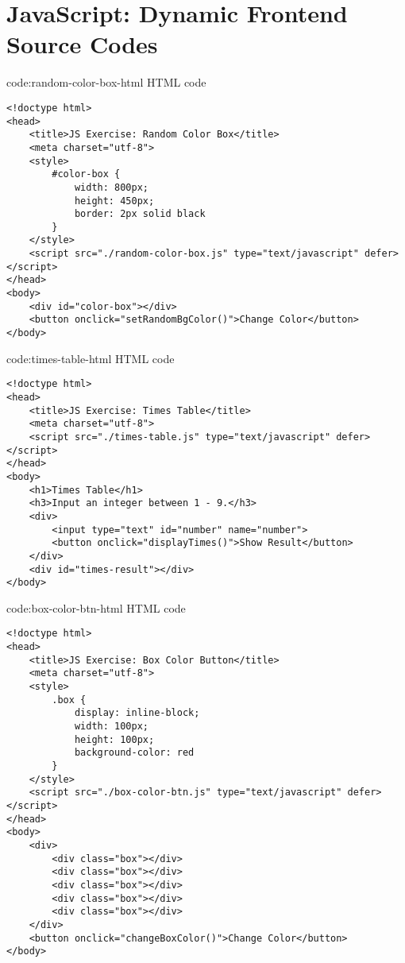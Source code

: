\section{JavaScript: Dynamic Frontend Source Codes}\label{sect:js-dynamic-frontend-codes}

\begin{codeenv}{code:random-color-box-html}{ HTML code}
\begin{verbatim}
<!doctype html>
<head>
    <title>JS Exercise: Random Color Box</title>
    <meta charset="utf-8">
    <style>
        #color-box {
            width: 800px;
            height: 450px;
            border: 2px solid black
        }
    </style>
    <script src="./random-color-box.js" type="text/javascript" defer></script>
</head>
<body>
    <div id="color-box"></div>
    <button onclick="setRandomBgColor()">Change Color</button>
</body>
\end{verbatim}
\end{codeenv}

\begin{codeenv}{code:times-table-html}{ HTML code}\begin{verbatim}
<!doctype html>
<head>
    <title>JS Exercise: Times Table</title>
    <meta charset="utf-8">
    <script src="./times-table.js" type="text/javascript" defer></script>
</head>
<body>
    <h1>Times Table</h1>
    <h3>Input an integer between 1 - 9.</h3>
    <div>
        <input type="text" id="number" name="number">
        <button onclick="displayTimes()">Show Result</button>
    </div>
    <div id="times-result"></div>
</body>
\end{verbatim}
\end{codeenv}

\begin{codeenv}{code:box-color-btn-html}{ HTML code}
\begin{verbatim}
<!doctype html>
<head>
    <title>JS Exercise: Box Color Button</title>
    <meta charset="utf-8">
    <style>
        .box {
            display: inline-block;
            width: 100px;
            height: 100px;
            background-color: red
        }
    </style>
    <script src="./box-color-btn.js" type="text/javascript" defer></script>
</head>
<body>
    <div>
        <div class="box"></div>
        <div class="box"></div>
        <div class="box"></div>
        <div class="box"></div>
        <div class="box"></div>
    </div>
    <button onclick="changeBoxColor()">Change Color</button>
</body>
\end{verbatim}
\end{codeenv}

